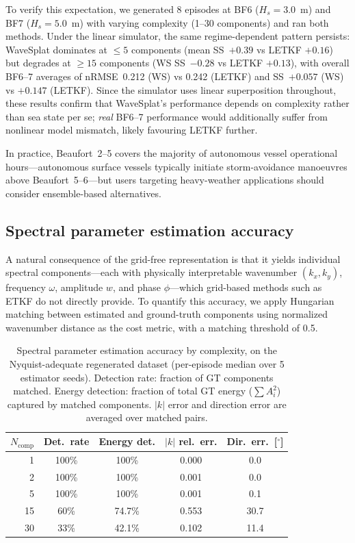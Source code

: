 To verify this expectation, we generated 8 episodes at BF6
($H_s{=}3.0$~m) and BF7 ($H_s{=}5.0$~m) with varying complexity
(1--30 components) and ran both methods.  Under the linear simulator,
the same regime-dependent pattern persists:
WaveSplat dominates at ${\leq}5$ components
(mean SS~$+0.39$ vs LETKF $+0.16$) but degrades at ${\geq}15$
components (WS SS~$-0.28$ vs LETKF $+0.13$), with overall BF6--7
averages of nRMSE~0.212 (WS) vs 0.242 (LETKF) and SS~$+0.057$ (WS) vs
$+0.147$ (LETKF).
Since the simulator uses linear superposition throughout, these results
confirm that WaveSplat's performance depends on complexity rather than
sea state per se; \emph{real} BF6--7 performance would additionally
suffer from nonlinear model mismatch, likely favouring LETKF further.

In practice, Beaufort~2--5 covers the majority of autonomous vessel
operational hours---autonomous surface vessels typically initiate
storm-avoidance manoeuvres above Beaufort~5--6---but users targeting
heavy-weather applications should consider ensemble-based alternatives.

\subsection{Spectral parameter estimation accuracy}
\label{sec:spectral_accuracy}

A natural consequence of the grid-free representation is that it yields
individual spectral components---each with physically interpretable
wavenumber $(k_x, k_y)$, frequency $\omega$, amplitude $w$, and phase
$\phi$---which grid-based methods such as ETKF do not directly provide.
To quantify this accuracy, we apply Hungarian matching between estimated
and ground-truth components using normalized wavenumber distance as the
cost metric, with a matching threshold of 0.5.

\begin{table}[t]
\centering
\caption{Spectral parameter estimation accuracy by complexity, on the
Nyquist-adequate regenerated dataset (per-episode median over 5 estimator
seeds).
Detection rate: fraction of GT components matched.
Energy detection: fraction of total GT energy ($\sum A_i^2$) captured
by matched components.
$|k|$ error and direction error are averaged over matched pairs.}
\label{tab:spectral_accuracy}
\begin{tabular}{rcccc}
\toprule
$N_{\text{comp}}$ & Det.\ rate & Energy det. & $|k|$ rel.\ err. & Dir.\ err.\ [$^\circ$] \\
\midrule
1  & 100\% & 100\%  & 0.000 & 0.0 \\
2  & 100\% & 100\%  & 0.001 & 0.0 \\
5  & 100\% & 100\%  & 0.001 & 0.1 \\
15 &  60\% &  74.7\%         & 0.553 & 30.7 \\
30 &  33\% &  42.1\%         & 0.102 & 11.4 \\
\bottomrule
\end{tabular}
\end{table}


